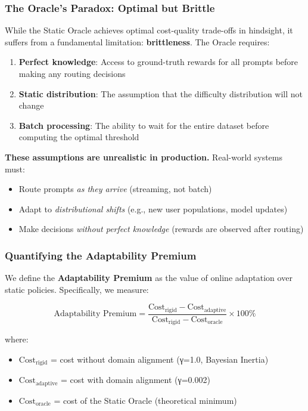 \subsubsection{The Oracle's Paradox: Optimal but Brittle}

While the Static Oracle achieves optimal cost-quality trade-offs in hindsight, it suffers from a fundamental limitation: \textbf{brittleness}. The Oracle requires:

\begin{enumerate}
    \item \textbf{Perfect knowledge}: Access to ground-truth rewards for all prompts before making any routing decisions
    \item \textbf{Static distribution}: The assumption that the difficulty distribution will not change
    \item \textbf{Batch processing}: The ability to wait for the entire dataset before computing the optimal threshold
\end{enumerate}

\textbf{These assumptions are unrealistic in production.} Real-world systems must:
\begin{itemize}
    \item Route prompts \emph{as they arrive} (streaming, not batch)
    \item Adapt to \emph{distributional shifts} (e.g., new user populations, model updates)
    \item Make decisions \emph{without perfect knowledge} (rewards are observed after routing)
\end{itemize}

\subsubsection{Quantifying the Adaptability Premium}

We define the \textbf{Adaptability Premium} as the value of online adaptation over static policies. Specifically, we measure:

\begin{equation}
    \text{Adaptability Premium} = \frac{\text{Cost}_{\text{rigid}} - \text{Cost}_{\text{adaptive}}}{\text{Cost}_{\text{rigid}} - \text{Cost}_{\text{oracle}}} \times 100\%
\end{equation}

where:
\begin{itemize}
    \item $\text{Cost}_{\text{rigid}}$ = cost without domain alignment (γ=1.0, Bayesian Inertia)
    \item $\text{Cost}_{\text{adaptive}}$ = cost with domain alignment (γ=0.002)
    \item $\text{Cost}_{\text{oracle}}$ = cost of the Static Oracle (theoretical minimum)
\end{itemize}

